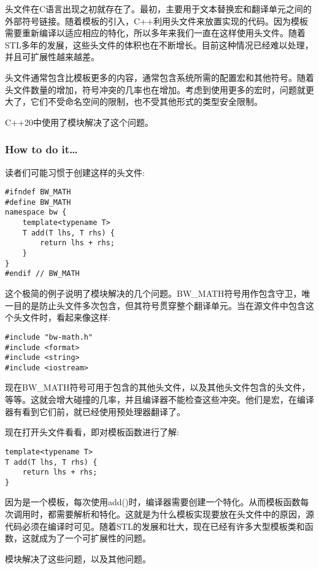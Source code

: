
头文件在C语言出现之初就存在了。最初，主要用于文本替换宏和翻译单元之间的外部符号链接。随着模板的引入，C++利用头文件来放置实现的代码。因为模板需要重新编译以适应相应的特化，所以多年来我们一直在这样使用头文件。随着STL多年的发展，这些头文件的体积也在不断增长。目前这种情况已经难以处理，并且可扩展性越来越差。

头文件通常包含比模板更多的内容，通常包含系统所需的配置宏和其他符号。随着头文件数量的增加，符号冲突的几率也在增加。考虑到使用更多的宏时，问题就更大了，它们不受命名空间的限制，也不受其他形式的类型安全限制。

C++20中使用了模块解决了这个问题。

\subsubsection{How to do it…}

读者们可能习惯于创建这样的头文件:

\begin{lstlisting}[style=styleCXX]
#ifndef BW_MATH
#define BW_MATH
namespace bw {
	template<typename T>
	T add(T lhs, T rhs) {
		return lhs + rhs;
	}
}
#endif // BW_MATH
\end{lstlisting}

这个极简的例子说明了模块解决的几个问题。BW\_MATH符号用作包含守卫，唯一目的是防止头文件多次包含，但其符号贯穿整个翻译单元。当在源文件中包含这个头文件时，看起来像这样:

\begin{lstlisting}[style=styleCXX]
#include "bw-math.h"
#include <format>
#include <string>
#include <iostream>
\end{lstlisting}

现在BW\_MATH符号可用于包含的其他头文件，以及其他头文件包含的头文件，等等。这就会增大碰撞的几率，并且编译器不能检查这些冲突。他们是宏，在编译器有看到它们前，就已经使用预处理器翻译了。

现在打开头文件看看，即对模板函数进行了解:

\begin{lstlisting}[style=styleCXX]
template<typename T>
T add(T lhs, T rhs) {
	return lhs + rhs;
}
\end{lstlisting}

因为是一个模板，每次使用add()时，编译器需要创建一个特化。从而模板函数每次调用时，都需要解析和特化。这就是为什么模板实现要放在头文件中的原因，源代码必须在编译时可见。随着STL的发展和壮大，现在已经有许多大型模板类和函数，这就成为了一个可扩展性的问题。

模块解决了这些问题，以及其他问题。

